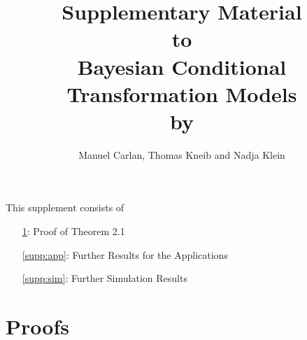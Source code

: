 \documentclass[12pt, a4paper]{article}
\begin{document}
\def\spacingset#1{\renewcommand{\baselinestretch}%
{#1}\small\normalsize} \spacingset{1}
\setdefaultleftmargin{3.5mm}{3mm}{3mm}{3mm}{3mm}{3mm}
\title{\textbf{Supplementary Material \\to} \\\vspace{1em} \LARGE{Bayesian Conditional Transformation Models}\\\vspace{1em}\normalsize{by}\\ }
\author{Manuel Carlan, Thomas Kneib and Nadja Klein
	}
\date{ }
\maketitle
\thispagestyle{empty}


This supplement consists of 
\begin{itemize}
\item[\ref{supp:proofs}:] Proof of Theorem 2.1
\item[\ref{supp:app}:] Further Results for the Applications
\item[\ref{supp:sim}:] Further Simulation Results
\end{itemize}

\vfill

\vfill


\vfill

\appendix
\renewcommand{\thesection}{Part~\Alph{section}}
\renewcommand\thefigure{\Alph{section}.\arabic{figure}}
\renewcommand\thetable{\Alph{section}.\arabic{table}}

\newpage
\setcounter{page}{1}
\spacingset{1.5}
\FloatBarrier

\section{Proofs}\label{supp:proofs}
\end{document}
